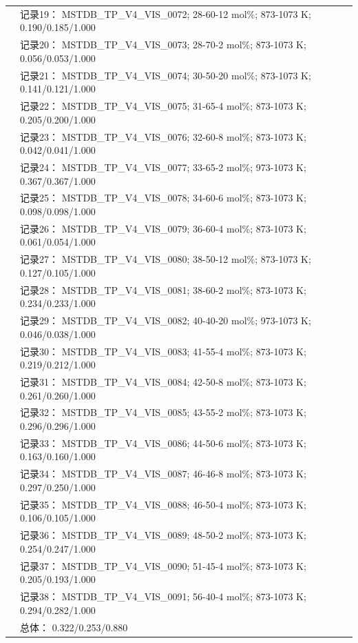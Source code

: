 \documentclass[12pt]{article}
\begin{document}
{\begin{longtable}[]{@{}
  >{\raggedright\arraybackslash}p{}
  >{\raggedright\arraybackslash}p{}@{}}
 & 记录19： MSTDB\_TP\_V4\_VIS\_0072; 28-60-12 mol\%; 873-1073 K; 0.190/0.185/1.000 \\
 & 记录20： MSTDB\_TP\_V4\_VIS\_0073; 28-70-2 mol\%; 873-1073 K; 0.056/0.053/1.000 \\
 & 记录21： MSTDB\_TP\_V4\_VIS\_0074; 30-50-20 mol\%; 873-1073 K; 0.141/0.121/1.000 \\
 & 记录22： MSTDB\_TP\_V4\_VIS\_0075; 31-65-4 mol\%; 873-1073 K; 0.205/0.200/1.000 \\
 & 记录23： MSTDB\_TP\_V4\_VIS\_0076; 32-60-8 mol\%; 873-1073 K; 0.042/0.041/1.000 \\
 & 记录24： MSTDB\_TP\_V4\_VIS\_0077; 33-65-2 mol\%; 973-1073 K; 0.367/0.367/1.000 \\
 & 记录25： MSTDB\_TP\_V4\_VIS\_0078; 34-60-6 mol\%; 873-1073 K; 0.098/0.098/1.000 \\
 & 记录26： MSTDB\_TP\_V4\_VIS\_0079; 36-60-4 mol\%; 873-1073 K; 0.061/0.054/1.000 \\
 & 记录27： MSTDB\_TP\_V4\_VIS\_0080; 38-50-12 mol\%; 873-1073 K; 0.127/0.105/1.000 \\
 & 记录28： MSTDB\_TP\_V4\_VIS\_0081; 38-60-2 mol\%; 873-1073 K; 0.234/0.233/1.000 \\
 & 记录29： MSTDB\_TP\_V4\_VIS\_0082; 40-40-20 mol\%; 973-1073 K; 0.046/0.038/1.000 \\
 & 记录30： MSTDB\_TP\_V4\_VIS\_0083; 41-55-4 mol\%; 873-1073 K; 0.219/0.212/1.000 \\
 & 记录31： MSTDB\_TP\_V4\_VIS\_0084; 42-50-8 mol\%; 873-1073 K; 0.261/0.260/1.000 \\
 & 记录32： MSTDB\_TP\_V4\_VIS\_0085; 43-55-2 mol\%; 873-1073 K; 0.296/0.296/1.000 \\
 & 记录33： MSTDB\_TP\_V4\_VIS\_0086; 44-50-6 mol\%; 873-1073 K; 0.163/0.160/1.000 \\
 & 记录34： MSTDB\_TP\_V4\_VIS\_0087; 46-46-8 mol\%; 873-1073 K; 0.297/0.250/1.000 \\
 & 记录35： MSTDB\_TP\_V4\_VIS\_0088; 46-50-4 mol\%; 873-1073 K; 0.106/0.105/1.000 \\
 & 记录36： MSTDB\_TP\_V4\_VIS\_0089; 48-50-2 mol\%; 873-1073 K; 0.254/0.247/1.000 \\
 & 记录37： MSTDB\_TP\_V4\_VIS\_0090; 51-45-4 mol\%; 873-1073 K; 0.205/0.193/1.000 \\
 & 记录38： MSTDB\_TP\_V4\_VIS\_0091; 56-40-4 mol\%; 873-1073 K; 0.294/0.282/1.000 \\
 & 总体： 0.322/0.253/0.880  \\


\end{longtable}}
\end{document}
